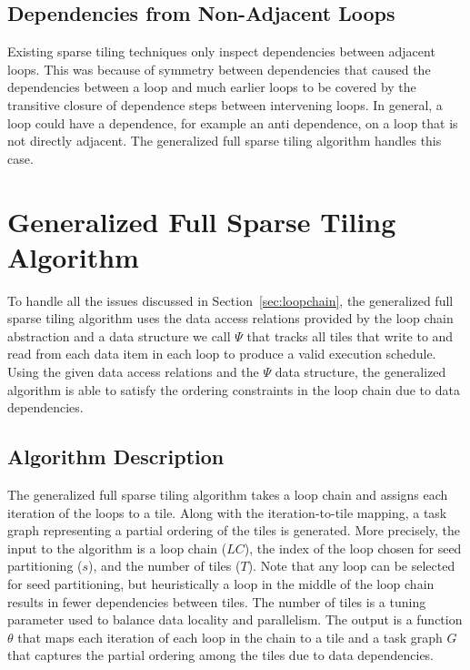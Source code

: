 \subsection{Dependencies from Non-Adjacent Loops}
\label{sec:prevloops}

Existing sparse tiling techniques only inspect 
dependencies between adjacent loops.  This was
because of symmetry between dependencies that caused the dependencies
between a loop and much earlier loops to be covered by the transitive closure
of dependence steps between intervening loops.  In general,
a loop could have a dependence, for example an anti dependence,
on a loop that is not directly adjacent.  The generalized full sparse tiling
algorithm handles this case.
  
\section{Generalized Full Sparse Tiling Algorithm}
\label{sec:generalizedFST}
To handle all the issues discussed in Section~\ref{sec:loopchain}, the generalized
full sparse tiling algorithm uses the data access relations provided by the
loop chain abstraction and a data structure we call $\Psi$ that tracks
all tiles that write to and read from each data item in each loop 
to produce a valid execution schedule.
Using the given data access relations and the $\Psi$ data structure, 
the generalized algorithm is able
to satisfy the ordering constraints in the loop chain due to
data dependencies.

%
\subsection{Algorithm Description}
\label{sec:algorithm}
The generalized full sparse tiling algorithm takes a loop chain
and assigns each iteration of the loops to a tile.
Along with the iteration-to-tile mapping, a task graph representing a partial ordering of the tiles is generated.
More precisely, the input to the algorithm is a loop chain ($LC$), 
the index of the loop chosen for seed partitioning ($s$), and the number of tiles ($T$).
Note that any loop can be selected for seed partitioning, but heuristically a loop in the middle
of the loop chain results in fewer dependencies between tiles.
The number of tiles is a tuning parameter used to balance data locality and parallelism.
The output is a function $\theta$ that maps each iteration of each loop in 
the chain to a tile and a task graph $G$ that captures the
partial ordering among the tiles due to data dependencies.

